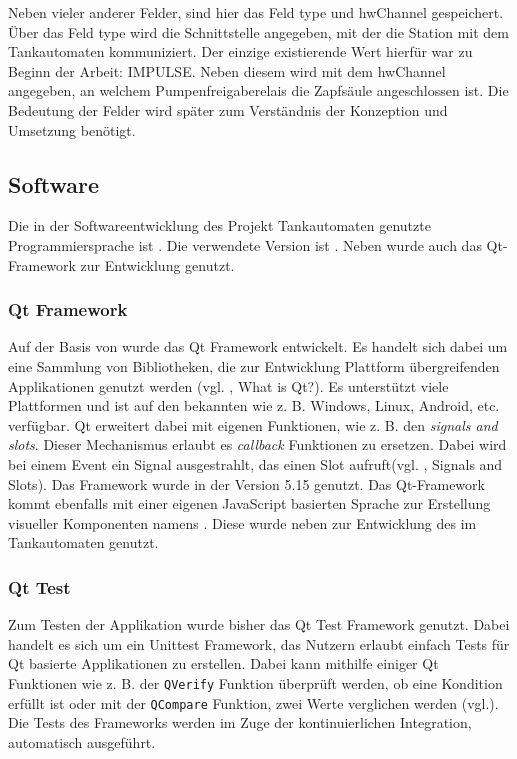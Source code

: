 \noindent Neben vieler anderer Felder, sind hier das Feld \glqq{}type\grqq{} und \glqq{}hwChannel\grqq{} gespeichert.
Über das Feld \glqq{}type\grqq{} wird die Schnittstelle angegeben, mit der die Station mit dem Tankautomaten kommuniziert. Der einzige existierende Wert hierfür war zu Beginn der Arbeit: \glqq{}IMPULSE\grqq{}. Neben diesem wird mit dem \glqq{}hwChannel\grqq{} angegeben, an welchem Pumpenfreigaberelais die Zapfsäule angeschlossen ist. Die Bedeutung der Felder wird später zum Verständnis der Konzeption und Umsetzung benötigt.
\subsection{Software}
Die in der Softwareentwicklung des Projekt \glqq{}Tankautomaten\grqq{} genutzte Programmiersprache ist \cpp. Die verwendete Version ist . Neben \cpp wurde auch das Qt-Framework zur Entwicklung genutzt.
\subsubsection{Qt Framework}
Auf der Basis von \cpp wurde das Qt Framework entwickelt. Es handelt sich dabei um eine Sammlung von Bibliotheken, die zur Entwicklung Plattform übergreifenden Applikationen genutzt werden (vgl. \cite{Qt-about}, \glqq{}What is Qt?\grqq{}). Es unterstützt viele Plattformen und ist auf den bekannten wie z. B. Windows, Linux, Android, etc. verfügbar. Qt erweitert dabei \cpp mit eigenen Funktionen, wie z. B. den \textit{signals and slots}. Dieser Mechanismus erlaubt es \textit{callback} Funktionen zu ersetzen. Dabei wird bei einem Event ein Signal ausgestrahlt, das einen Slot aufruft(vgl. \cite{Qt-signals-and-slots}, \glqq{}Signals and Slots\grqq{}). Das Framework wurde in der Version 5.15 genutzt. Das Qt-Framework kommt ebenfalls mit einer eigenen JavaScript basierten Sprache zur Erstellung visueller Komponenten namens . Diese wurde neben \cpp zur Entwicklung des  im Tankautomaten genutzt.
\subsubsection{Qt Test}
Zum Testen der Applikation wurde bisher das Qt Test Framework genutzt. Dabei handelt es sich um ein Unittest Framework, das Nutzern erlaubt einfach Tests für Qt basierte Applikationen zu erstellen. Dabei kann mithilfe einiger Qt Funktionen wie z. B. der \verb|QVerify| Funktion überprüft werden, ob eine Kondition erfüllt ist oder mit der \verb|QCompare| Funktion, zwei Werte verglichen werden (vgl.\cite{QTest}). Die Tests des Frameworks werden im Zuge der kontinuierlichen Integration, automatisch ausgeführt.
